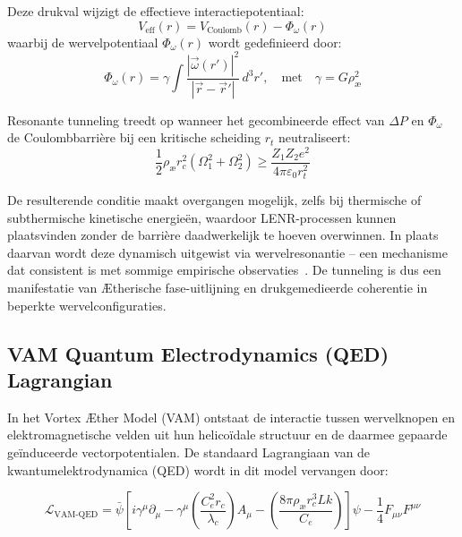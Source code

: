 Deze drukval wijzigt de effectieve interactiepotentiaal:
\begin{equation}
    V_{\text{eff}}(r) = V_{\text{Coulomb}}(r) - \Phi_\omega(r)
\end{equation}
waarbij de wervelpotentiaal \( \Phi_\omega(r) \) wordt gedefinieerd door:
\begin{equation}
    \Phi_\omega(r) = \gamma \int \frac{|\vec{\omega}(r')|^2}{|\vec{r} - \vec{r}'|} \, d^3r',
    \quad \text{met} \quad
    \gamma = G \rho_{\text{\ae}}^2
\end{equation}

Resonante tunneling treedt op wanneer het gecombineerde effect van \( \Delta P \) en \( \Phi_\omega \) de Coulombbarrière bij een kritische scheiding \( r_t \) neutraliseert:
\begin{equation}
    \frac{1}{2} \rho_{\text{\ae}} r_c^2 (\Omega_1^2 + \Omega_2^2) \geq \frac{Z_1 Z_2 e^2}{4\pi \varepsilon_0 r_t^2}
\end{equation}

De resulterende conditie maakt overgangen mogelijk, zelfs bij thermische of subthermische kinetische energieën, waardoor LENR-processen kunnen plaatsvinden zonder de barrière daadwerkelijk te hoeven overwinnen. In plaats daarvan wordt deze dynamisch uitgewist via wervelresonantie – een mechanisme dat consistent is met sommige empirische observaties~\cite{Storms2021}. De tunneling is dus een manifestatie van Ætherische fase-uitlijning en drukgemedieerde coherentie in beperkte wervelconfiguraties.



\subsection*{VAM Quantum Electrodynamics (QED) Lagrangian}

In het Vortex Æther Model (VAM) ontstaat de interactie tussen wervelknopen en elektromagnetische velden uit hun helicoïdale structuur en de daarmee gepaarde geïnduceerde vectorpotentialen. De standaard Lagrangiaan van de kwantumelektrodynamica (QED) wordt in dit model vervangen door:

\begin{equation}
    \mathcal{L}_{\text{VAM-QED}} =
    \bar{\psi} \left[ i \gamma^\mu \partial_\mu
                   - \gamma^\mu \left( \frac{C_e^2 r_c}{\lambda_c} \right) A_\mu
                   - \left( \frac{8\pi \rho_{\text{\ae}} r_c^3 Lk}{C_e} \right) \right] \psi
    - \frac{1}{4} F_{\mu\nu} F^{\mu\nu}
\end{equation}

